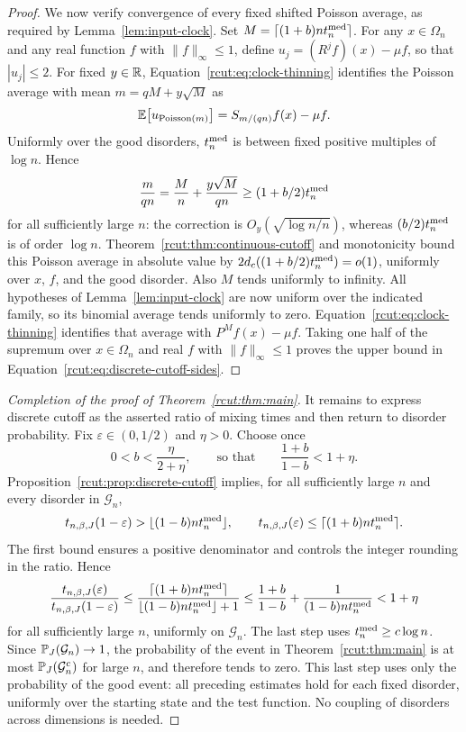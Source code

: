 \begin{proof}
We now verify convergence of every fixed shifted Poisson average,
as required by Lemma~\ref{lem:input-clock}.  Set
$M=\lceil(1+b)nt_n^{\rm med}\rceil$.  For any $x\in\Omega_n$ and any
real function $f$ with $\|f\|_\infty\le1$, define
$u_j=(R^jf)(x)-\mu f$, so that $|u_j|\le2$.
For fixed $y\in\R$, Equation~\eqref{rcut:eq:clock-thinning} identifies
the Poisson average with mean $m=q M+y\sqrt M$ as
\[
 \E\bigl[u_{\operatorname{Poisson}(m)}\bigr]
 =S_{m/(q n)}f(x)-\mu f.
\]
Uniformly over the good disorders, $t_n^{\rm med}$ is between fixed positive
multiples of $\log n$.  Hence
\[
 \frac{m}{q n}
 =\frac Mn+\frac{y\sqrt M}{q n}
 \ge(1+b/2)t_n^{\rm med}
\]
for all sufficiently large $n$: the correction is
$O_y(\sqrt{\log n/n})$, whereas $(b/2)t_n^{\rm med}$ is of order $\log n$.
Theorem~\ref{rcut:thm:continuous-cutoff} and monotonicity bound this Poisson
average in absolute value by $2d_c((1+b/2)t_n^{\rm med})=o(1)$, uniformly over
$x$, $f$, and the good disorder.  Also $M$ tends uniformly to infinity.
All hypotheses of Lemma~\ref{lem:input-clock} are now uniform over
the indicated family, so its binomial average tends uniformly to zero.
Equation~\eqref{rcut:eq:clock-thinning} identifies that average with
$P^Mf(x)-\mu f$.
Taking one half of the supremum over $x\in\Omega_n$ and real
$f$ with $\|f\|_\infty\le1$ proves the upper bound in
Equation~\eqref{rcut:eq:discrete-cutoff-sides}.
\end{proof}

\begin{proof}[Completion of the proof of Theorem~\ref{rcut:thm:main}]
It remains to express discrete cutoff as the asserted ratio of mixing
times and then return to disorder probability.  Fix
$\varepsilon\in(0,1/2)$ and $\eta>0$.  Choose once
\[
 0<b<\frac{\eta}{2+\eta},
 \qquad\text{so that}\qquad
 \frac{1+b}{1-b}<1+\eta.
\]
Proposition~\ref{rcut:prop:discrete-cutoff} implies, for all sufficiently
large $n$ and every disorder in $\mathcal G_n$,
\[
 t_{n,\beta,J}(1-\varepsilon)>
                \lfloor(1-b)nt_n^{\rm med}\rfloor,
 \qquad
 t_{n,\beta,J}(\varepsilon)\le
                \lceil(1+b)nt_n^{\rm med}\rceil.
\]
The first bound ensures a positive denominator and controls the
integer rounding in the ratio.  Hence
\[
 \frac{t_{n,\beta,J}(\varepsilon)}
      {t_{n,\beta,J}(1-\varepsilon)}
 \le\frac{\lceil(1+b)nt_n^{\rm med}\rceil}
          {\lfloor(1-b)nt_n^{\rm med}\rfloor+1}
 \le\frac{1+b}{1-b}+\frac{1}{(1-b)nt_n^{\rm med}}<1+\eta
\]
for all sufficiently large $n$, uniformly on $\mathcal G_n$.
The last step uses $t_n^{\rm med}\ge c\log n$.
Since $\P_J(\mathcal G_n)\to1$, the probability of the event in
Theorem~\ref{rcut:thm:main} is at most $\P_J(\mathcal G_n^c)$ for large $n$,
and therefore tends to zero.  This last step uses only the probability
of the good event: all preceding estimates hold for each fixed disorder,
uniformly over the starting state and the test function.  No coupling
of disorders across dimensions is needed.
\end{proof}
